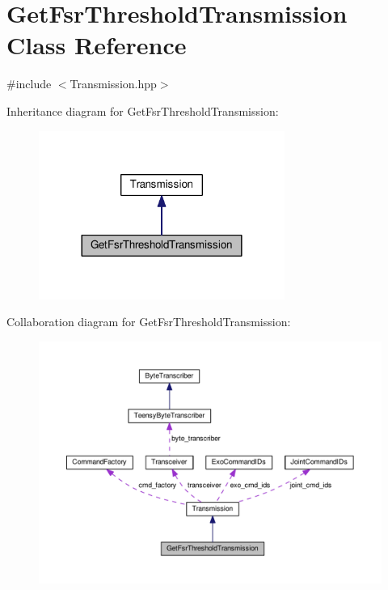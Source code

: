 \hypertarget{classGetFsrThresholdTransmission}{}\section{Get\+Fsr\+Threshold\+Transmission Class Reference}
\label{classGetFsrThresholdTransmission}


{\ttfamily \#include $<$Transmission.\+hpp$>$}



Inheritance diagram for Get\+Fsr\+Threshold\+Transmission\+:\nopagebreak
\begin{figure}[H]
\begin{center}
\leavevmode
\includegraphics[width=228pt]{classGetFsrThresholdTransmission__inherit__graph}
\end{center}
\end{figure}


Collaboration diagram for Get\+Fsr\+Threshold\+Transmission\+:\nopagebreak
\begin{figure}[H]
\begin{center}
\leavevmode
\includegraphics[width=350pt]{classGetFsrThresholdTransmission__coll__graph}
\end{center}
\end{figure}
